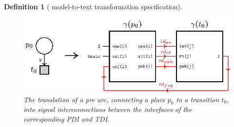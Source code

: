 \documentclass[pdflatex,sn-mathphys]{sn-jnl}%
\theoremstyle{thmstyleone}%
\theoremstyle{thmstyletwo}%
\theoremstyle{thmstylethree}%
\newtheorem{definition}{Definition}%
\begin{document}
\begin{definition}[\hilecop{} model-to-text transformation specification]
  \begin{figure}[h]
    \centering
    \includegraphics[keepaspectratio,width=.8\textwidth]{gen-pre-arc.eps}
    \caption{The translation of a pre arc, connecting a place $p_0$ to
      a transition $t_0$, into signal interconnections between the
      interfaces of the corresponding PDI and TDI. }
    \label{fig:gen-pre-arc}
  \end{figure}


\end{definition}
\end{document}
